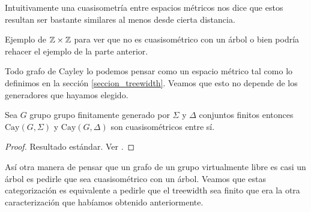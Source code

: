 \documentclass[tesis.tex]{subfiles}
\newcommand{\fg}{grupo finitamente generado }
\begin{document}
Intuitivamente una cuasisometría entre espacios métricos nos dice que estos resultan ser bastante similares al menos desde cierta distancia. 
\medskip

\begin{ej}
Ejemplo de $\mathbb{Z} \times \mathbb{Z}$ para ver que no es cuasisométrico con un árbol o bien podría rehacer el ejemplo de la parte anterior.
\end{ej}

Todo grafo de Cayley lo podemos pensar como un espacio métrico tal como lo definimos en la sección \ref{seccion_treewidth}.  
Veamos que esto no depende de los generadores que hayamos elegido.

\begin{prop}
	Sea $G$ grupo \fg por $\Sigma$ y $\Delta$ conjuntos finitos entonces $\text{Cay}(G,\Sigma)$ y $\text{Cay}(G, \Delta)$ son cuasisométricos entre sí.
\end{prop}

\begin{proof}
	Resultado estándar. Ver \cite{bridson2013metric}.
\end{proof}



Así otra manera de pensar que un grafo de un grupo virtualmente libre es casi un árbol es pedirle que sea cuasisométrico con un árbol. 
Veamos que estas categorización es equivalente a pedirle que el treewidth sea finito que era la otra caracterización que habíamos obtenido anteriormente.
\end{document}
